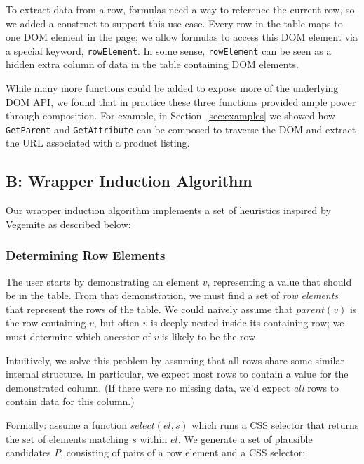 \documentclass[sigconf,10pt]{acmart}
\begin{document}
To extract data from a row, formulas need a way to reference the current
row, so we added a construct to support this use case. Every row in the
table maps to one DOM element in the page; we allow formulas to access
this DOM element via a special keyword, \texttt{rowElement}. In some
sense, \texttt{rowElement} can be seen as a hidden extra column of data
in the table containing DOM elements.

While many more functions could be added to expose more of the
underlying DOM API, we found that in practice these three functions
provided ample power through composition. For example, in
Section~\ref{sec:examples} we showed how \texttt{GetParent} and
\texttt{GetAttribute} can be composed to traverse the DOM and extract
the URL associated with a product listing.

\hypertarget{appendix-b}{%
\subsection*{B: Wrapper Induction Algorithm}\label{appendix-b}}

Our wrapper induction algorithm implements a set of heuristics inspired by Vegemite
as described below:

\hypertarget{determining-row-elements}{%
\subsubsection*{Determining Row
Elements}\label{determining-row-elements}}

The user starts by demonstrating an element \(v\), representing a value
that should be in the table. From that demonstration, we must find a set
of \emph{row elements} that represent the rows of the table. We could
naively assume that \(parent(v)\) is the row containing \(v\), but often
\(v\) is deeply nested inside its containing row; we must determine
which ancestor of \(v\) is likely to be the row.

Intuitively, we solve this problem by assuming that all rows share some
similar internal structure. In particular, we expect most rows to
contain a value for the demonstrated column. (If there were no missing
data, we'd expect \emph{all} rows to contain data for this column.)

Formally: assume a function \(select(el, s)\) which runs a CSS selector
that returns the set of elements matching \(s\) within \(el\). We
generate a set of plausible candidates \(P\), consisting of pairs of a
row element and a CSS selector:
\end{document}
